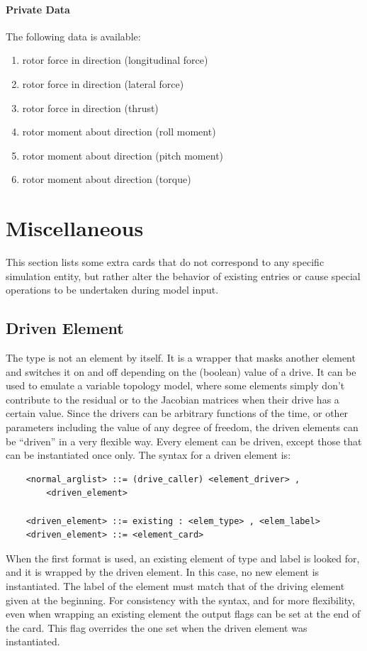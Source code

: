 \paragraph{Private Data}
The following data is available:
\begin{enumerate}
\item {} rotor force in  direction (longitudinal force)
\item {} rotor force in  direction (lateral force)
\item {} rotor force in  direction (thrust)
\item {} rotor moment about  direction (roll moment)
\item {} rotor moment about  direction (pitch moment)
\item {} rotor moment about  direction (torque)
\end{enumerate}



\section{Miscellaneous}
This section lists some extra cards that do not correspond to any
specific simulation entity, but rather alter the behavior 
of existing entries or cause special operations to be undertaken
during model input.



\subsection{Driven Element}
The  type is not an element by itself. It is a wrapper that
masks another element and switches it on and off depending on the (boolean)
value of a drive. It can be used to emulate a variable topology model, where 
some elements simply don't contribute to the residual or to the Jacobian
matrices when their drive has a certain value. Since the drivers can be
arbitrary functions of the time, or other parameters including the value of
any degree of freedom, the driven elements can be ``driven'' in a very
flexible way. Every element can be driven, except those that can be
instantiated once only.
The syntax for a driven element is:
\begin{verbatim}
    <normal_arglist> ::= (drive_caller) <element_driver> ,
        <driven_element>

    <driven_element> ::= existing : <elem_type> , <elem_label>
    <driven_element> ::= <element_card>
\end{verbatim}
When the first format is used, an existing element 
of type  and label  is looked for, 
and it is wrapped by the driven element.
In this case, no new element is instantiated.
The label of the element must match that of the driving element given 
at the beginning.
For consistency with the syntax, and for more flexibility, 
even when wrapping an existing element the output flags can be set
at the end of the card.
This flag overrides the one set when the driven element was instantiated.

